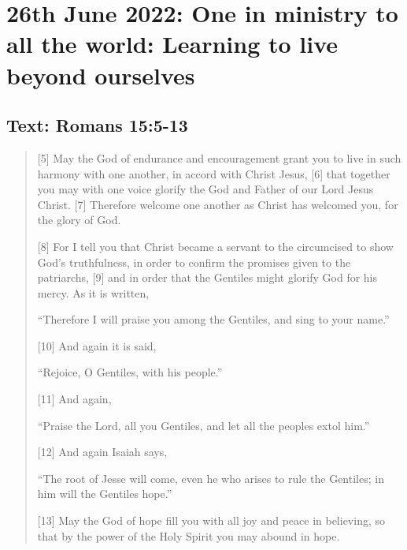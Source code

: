\section{26th June 2022: One in ministry to all the world: Learning to live
beyond ourselves}
\subsection*{Text: Romans 15:5-13}
  \begin{quote}
    [5] May the God of endurance and encouragement grant you to live in such
    harmony with one another, in accord with Christ Jesus, [6] that together
    you may with one voice glorify the God and Father of our Lord Jesus
    Christ.  [7] Therefore welcome one another as Christ has welcomed you,
    for the glory of God.

    [8] For I tell you that Christ became a servant to the circumcised to
    show God’s truthfulness, in order to confirm the promises given to the
    patriarchs, [9] and in order that the Gentiles might glorify God for his
    mercy.  As it is written,

      “Therefore I will praise you among the Gentiles,
          and sing to your name.”


      [10] And again it is said,

        “Rejoice, O Gentiles, with his people.”


      [11] And again,

        “Praise the Lord, all you Gentiles,
            and let all the peoples extol him.”


      [12] And again Isaiah says,

        “The root of Jesse will come,
            even he who arises to rule the Gentiles;
        in him will the Gentiles hope.”


      [13] May the God of hope fill you with all joy and peace in believing,
      so that by the power of the Holy Spirit you may abound in hope.
  \end{quote}
